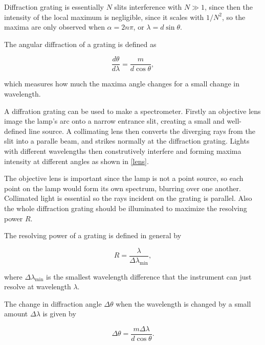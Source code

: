 \documentclass[english,a4paper,12pt]{report}
\begin{document}


Diffraction grating is essentially \(N\) slits interference with \(N \gg 1\), since then the intensity of the local maximum is negligible, since it scales with \(1/N^2\), so the maxima are only observed when \(\alpha = 2n\pi \), or \(\lambda = d\sin \theta \).    

The angular diffraction of a grating is defined as 

\begin{equation}
    \frac{d \theta }{d \lambda } =  \frac{m}{d \cos \theta },
\end{equation}

which measures how much the maxima angle changes for a small change in wavelength.

A diffration grating can be used to make a spectrometer. Firstly an objective lens image the lamp's arc onto a narrow entrance slit, creating a small and well-defined line source. A collimating lens then converts the diverging rays from the slit into a paralle beam, and strikes normally at the diffraction grating. Lights with different wavelengths then construtively interfere and forming maxima intensity at different angles as shown in \cref{lens}. 

The objective lens is important since the lamp is not a point source, so each point on the lamp would form its own spectrum, blurring over one another. Collimated light is essential so the rays incident on the grating is parallel. Also the whole diffraction grating should be illuminated to maximize the resolving power \(R\).

The resolving power of a grating is defined in general by 

\begin{equation}
    R = \frac{\lambda }{\Delta \lambda _{\text{min} } },
\end{equation}

where \(\Delta \lambda _{\text{min} } \) is the smallest wavelength difference that the instrument can just resolve at wavelength \(\lambda \).  

The change in diffraction angle \(\Delta \theta \) when the wavelength is changed by a small amount \(\Delta \lambda \) is given by 

\begin{equation}
    \Delta \theta = \frac{m \Delta \lambda }{d \cos \theta }. 
\end{equation}
\end{document}

